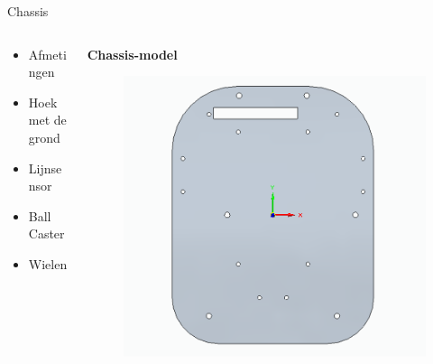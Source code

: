 \documentclass[aspectratio=169,kulak,t,handout]{kulakbeamer} %
\begin{document}
\begin{frame}{Chassis}
	\begin{columns}
	\begin{column}{0.50\textwidth}\centering
		\begin{itemize}
			\item Afmetingen
			\item Hoek met de grond
			\item Lijnsensor
			\item Ball Caster
			\item Wielen
		\end{itemize}
	\end{column}
	\begin{column}{0.75\textwidth}\centering
		{\bf{Chassis-model}}\\[.2cm]
		\begin{figure}
			\centering
			\includegraphics[width=.55\textwidth]{chassis3d}
			
			\label{fig:chassis}
		\end{figure}
	\end{column}
\end{columns}	
\end{frame}
\end{document}
